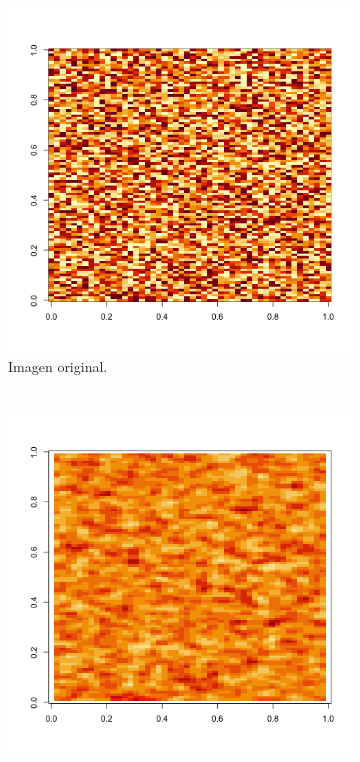 \documentclass[12pt,letterpaper]{article}
\begin{document}
\begin{figure}
 	\centering 
 	\begin{subfigure}[b]{0.3\linewidth}
 		\includegraphics[width=\linewidth]{1.png} 		
 		\caption{Imagen original. \\ \, }
 		 		\label{1}
 	\end{subfigure}  \hfill
 	\begin{subfigure}[b]{0.3\linewidth}
 		\includegraphics[width=\linewidth]{2.png} 		

\end{subfigure}
\end{figure}
\end{document}
